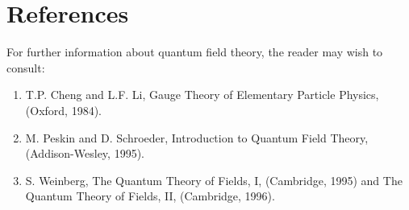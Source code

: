 \documentclass[12pt]{article}
\begin{document}
\section*{References}
For further information about quantum field theory, the
reader may wish to consult:

\begin{enumerate}

\item T.P. Cheng and L.F. Li, Gauge Theory of Elementary Particle
Physics, (Oxford, 1984).

\item M. Peskin and D. Schroeder,  Introduction to Quantum Field
Theory, (Addison-Wesley, 1995).

\item S. Weinberg,  The Quantum Theory of Fields, I, (Cambridge,
1995) and  The Quantum Theory of Fields, II, (Cambridge, 1996).

\end{enumerate}
\end{document}

